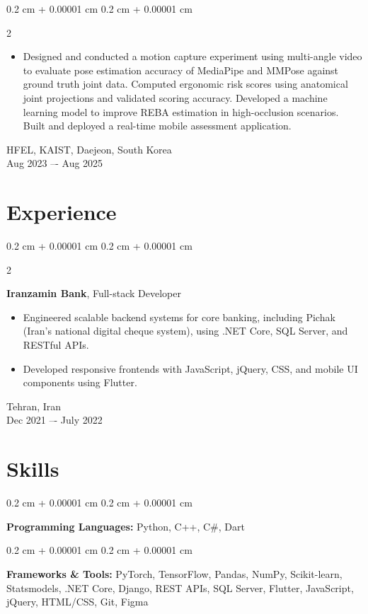 \documentclass[10pt, letterpaper]{article}
\newenvironment{highlights}{
    \begin{itemize}[
        topsep=0.10 cm,
        parsep=0.10 cm,
        partopsep=0pt,
        itemsep=0pt,
        leftmargin=0.4 cm + 10pt
    ]
}{
    \end{itemize}
} %
\newenvironment{onecolentry}{
    \begin{adjustwidth}{
        0.2 cm + 0.00001 cm
    }{
        0.2 cm + 0.00001 cm
    }
}{
    \end{adjustwidth}
} %
\newenvironment{twocolentry}[2][]{
    \onecolentry
    \def\secondColumn{#2}
    \setcolumnwidth{\fill, 3 cm}
    \begin{paracol}{2}
}{
    \switchcolumn \raggedleft \secondColumn
    \end{paracol}
    \endonecolentry
} %
\begin{document}
\begin{twocolentry}{
    HFEL, KAIST, Daejeon, South Korea \\
    Aug 2023 –- Aug 2025
}
    \begin{highlights}
        \item Designed and conducted a motion capture experiment using multi-angle video to evaluate pose estimation accuracy of MediaPipe and MMPose against ground truth joint data. Computed ergonomic risk scores using anatomical joint projections and validated scoring accuracy. Developed a machine learning model to improve REBA estimation in high-occlusion scenarios. Built and deployed a real-time mobile assessment application.
    \end{highlights}
\end{twocolentry}

\section{Experience}

\begin{twocolentry}{
    Tehran, Iran \\
    
    Dec 2021 –- July 2022
}
    \textbf{Iranzamin Bank}, Full-stack Developer
    \begin{highlights}
        \item Engineered scalable backend systems for core banking, including Pichak (Iran’s national digital cheque system), using .NET Core, SQL Server, and RESTful APIs.
        \item Developed responsive frontends with JavaScript, jQuery, CSS, and mobile UI components using Flutter.
    \end{highlights}

\end{twocolentry}

\section{Skills}

\begin{onecolentry}
    \textbf{Programming Languages:} Python, C++, C\#, Dart
\end{onecolentry}

\vspace{0.1cm}

\begin{onecolentry}
    \textbf{Frameworks \& Tools:}  PyTorch, TensorFlow, Pandas, NumPy, Scikit-learn, Statsmodels, .NET Core,  Django, REST APIs, SQL Server, Flutter, JavaScript, jQuery, HTML/CSS, Git, Figma
\end{onecolentry}
\end{document}
